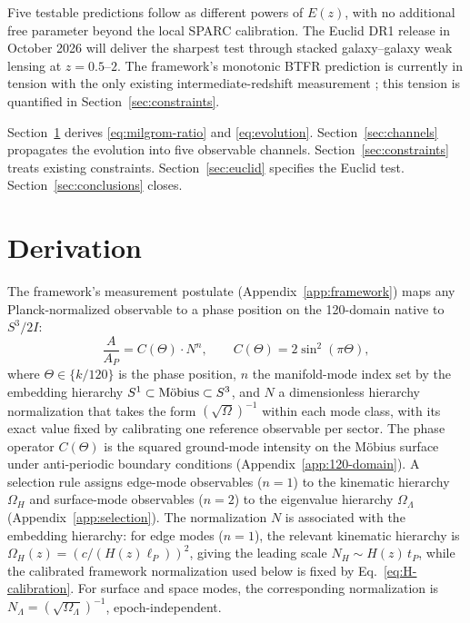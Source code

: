\documentclass[11pt,a4paper]{article}
\numberwithin{equation}{section}
\numberwithin{table}{section}
\numberwithin{figure}{section}
\newcommand{\Mob}{\ifmmode\text{M\"obius}\else M\"obius\fi}
\newcommand{\Ez}{E(z)}
\begin{document}
Five testable predictions follow as different powers of $\Ez$, with no
additional free parameter beyond the local SPARC calibration. The
Euclid DR1 release in October 2026 will deliver the sharpest test
through stacked galaxy--galaxy weak lensing at $z = 0.5$--$2$. The
framework's monotonic BTFR prediction is currently in tension with the
only existing intermediate-redshift measurement \citep{Ubler2017}; this
tension is quantified in Section~\ref{sec:constraints}.

Section~\ref{sec:derivation} derives \eqref{eq:milgrom-ratio} and
\eqref{eq:evolution}. Section~\ref{sec:channels} propagates the
evolution into five observable channels.
Section~\ref{sec:constraints} treats existing constraints.
Section~\ref{sec:euclid} specifies the Euclid test.
Section~\ref{sec:conclusions} closes.

\section{Derivation}
\label{sec:derivation}

The framework's measurement postulate (Appendix~\ref{app:framework})
maps any Planck-normalized observable to a phase position on the
120-domain native to $S^3/2I$:
\begin{equation}
\frac{A}{A_P} = C(\Theta) \cdot N^n,
\qquad C(\Theta) = 2\sin^2(\pi\Theta),
\label{eq:scaling-law}
\end{equation}
where $\Theta \in \{k/120\}$ is the phase position, $n$ the
manifold-mode index set by the embedding hierarchy
$S^1 \subset \Mob \subset S^3$, and $N$ a dimensionless hierarchy
normalization that takes the form $(\sqrt{\Omega})^{-1}$ within each
mode class, with its exact value fixed by calibrating one reference
observable per sector. The phase operator $C(\Theta)$ is the squared
ground-mode intensity on the \Mob{} surface under anti-periodic
boundary conditions (Appendix~\ref{app:120-domain}). A selection rule
assigns edge-mode observables ($n = 1$) to the kinematic hierarchy
$\Omega_H$ and surface-mode observables ($n = 2$) to the eigenvalue
hierarchy $\Omega_\Lambda$ (Appendix~\ref{app:selection}). The
normalization $N$ is associated with the embedding hierarchy: for edge
modes ($n = 1$), the relevant kinematic hierarchy is
$\Omega_H(z) = (c/(H(z)\ell_P))^2$, giving the leading scale
$N_H \sim H(z)\,t_P$, while the calibrated framework normalization used
below is fixed by Eq.~\eqref{eq:H-calibration}. For surface and space
modes, the corresponding normalization is $N_\Lambda =
(\sqrt{\Omega_\Lambda})^{-1}$, epoch-independent.
\end{document}
